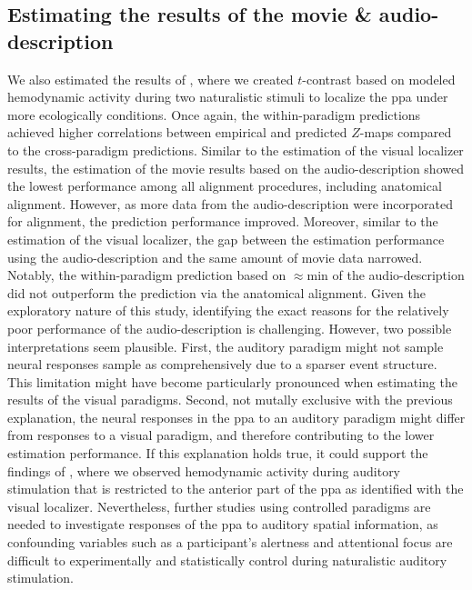 \subsection{Estimating the results of the movie \& audio-description}
%
We also estimated the results of \citet{haeusler2022processing}, where we
created $t$-contrast based on modeled hemodynamic activity during two
naturalistic stimuli to localize the \ac{ppa} under more ecologically
conditions.
%
Once again, the within-paradigm predictions achieved higher correlations between
empirical and predicted $Z$-maps compared to the cross-paradigm predictions.
%
Similar to the estimation of the visual localizer results, the estimation of the
movie results based on the audio-description showed the lowest performance among
all alignment procedures, including anatomical alignment.
%
However, as more data from the audio-description were incorporated for
alignment, the prediction performance improved.
%
Moreover, similar to the estimation of the visual localizer, the gap between the
estimation performance using the audio-description and the same amount of movie
data narrowed.
%
Notably, the within-paradigm prediction based on $\approx$\unit[15]{min} of the
audio-description did not outperform the prediction via the anatomical
alignment.
%
Given the exploratory nature of this study, identifying the exact reasons for
the relatively poor performance of the audio-description is challenging.
%
However, two possible interpretations seem plausible.
%
First, the auditory paradigm might not sample neural responses sample as
comprehensively due to a sparser event structure.
%
This limitation might have become particularly pronounced when estimating the
results of the visual paradigms.
%
Second, not mutally exclusive with the previous explanation, the neural
responses in the \ac{ppa} to an auditory paradigm might differ from responses to
a visual paradigm, and therefore contributing to the lower estimation
performance.
%
If this explanation holds true, it could support the findings of
\citet{haeusler2022processing}, where we observed hemodynamic activity during
auditory stimulation that is restricted to the anterior part of the \ac{ppa} as
identified with the visual localizer.
%
Nevertheless, further studies using controlled paradigms are needed to
investigate responses of the \ac{ppa} to auditory spatial information, as
confounding variables such as a participant's alertness and attentional focus
are difficult to experimentally and statistically control during naturalistic
auditory stimulation.

